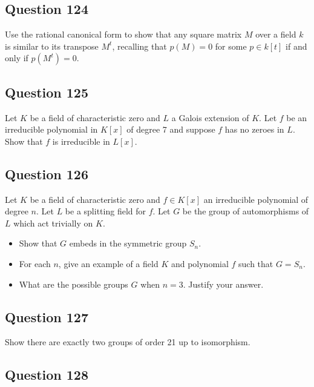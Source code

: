 \documentclass[12pt]{article}
\begin{document}
\hypertarget{question-124}{%
\subsection{Question 124}\label{question-124}}

Use the rational canonical form to show that any square matrix \(M\)
over a field \(k\) is similar to its transpose \(M^t\), recalling that
\(p(M)=0\) for some \(p\in k[t]\) if and only if \(p(M^t)=0\).

\hypertarget{question-125}{%
\subsection{Question 125}\label{question-125}}

Let \(K\) be a field of characteristic zero and \(L\) a Galois extension
of \(K\). Let \(f\) be an irreducible polynomial in \(K[x]\) of degree 7
and suppose \(f\) has no zeroes in \(L\). Show that \(f\) is irreducible
in \(L[x]\).

\hypertarget{question-126}{%
\subsection{Question 126}\label{question-126}}

Let \(K\) be a field of characteristic zero and \(f\in K[x]\) an
irreducible polynomial of degree \(n\). Let \(L\) be a splitting field
for \(f\). Let \(G\) be the group of automorphisms of \(L\) which act
trivially on \(K\).

\begin{itemize}
\item
  Show that \(G\) embeds in the symmetric group \(S_n\).
\item
  For each \(n\), give an example of a field \(K\) and polynomial \(f\)
  such that \(G=S_n\).
\item
  What are the possible groups \(G\) when \(n=3\). Justify your answer.
\end{itemize}

\hypertarget{question-127}{%
\subsection{Question 127}\label{question-127}}

Show there are exactly two groups of order 21 up to isomorphism.

\hypertarget{question-128}{%
\subsection{Question 128}\label{question-128}}
\end{document}
